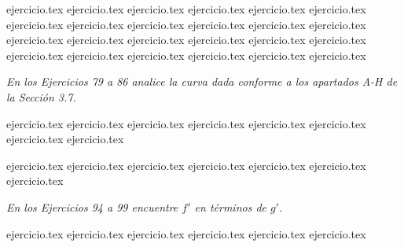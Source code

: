 \begin{enumerate}
    \setcounter{enumi}{54}
    {ejercicio.tex}
{ejercicio.tex}
{ejercicio.tex}
{ejercicio.tex}
{ejercicio.tex}
{ejercicio.tex}
{ejercicio.tex}
{ejercicio.tex}
{ejercicio.tex}
{ejercicio.tex}
{ejercicio.tex}
{ejercicio.tex}
{ejercicio.tex}
{ejercicio.tex}
{ejercicio.tex}
{ejercicio.tex}
{ejercicio.tex}
{ejercicio.tex}
{ejercicio.tex}
{ejercicio.tex}
{ejercicio.tex}
{ejercicio.tex}
{ejercicio.tex}
{ejercicio.tex}
\end{enumerate}

\vspace{1em}
\noindent \textit{En los Ejercicios 79 a 86 analice la curva dada conforme a los apartados A-H de la Sección 3.7.}

\begin{enumerate}
    \setcounter{enumi}{78}
    {ejercicio.tex}
{ejercicio.tex}
{ejercicio.tex}
{ejercicio.tex}
{ejercicio.tex}
{ejercicio.tex}
{ejercicio.tex}
{ejercicio.tex}
\end{enumerate}

\begin{enumerate}
    \setcounter{enumi}{86}
    {ejercicio.tex}
{ejercicio.tex}
{ejercicio.tex}
{ejercicio.tex}
{ejercicio.tex}
{ejercicio.tex}
{ejercicio.tex}
\end{enumerate}

\vspace{1em}
\noindent \textit{En los Ejercicios 94 a 99 encuentre $f'$ en términos de $g'$.}

\begin{enumerate}
    \setcounter{enumi}{93}
    {ejercicio.tex}
{ejercicio.tex}
{ejercicio.tex}
{ejercicio.tex}
{ejercicio.tex}
{ejercicio.tex}
\end{enumerate}

